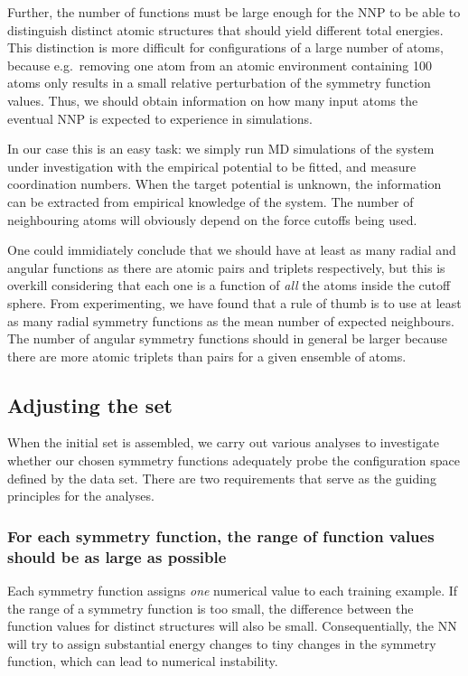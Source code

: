 \documentclass[twoside,english]{uiofysmaster}
\begin{document}
Further, the number of functions must be large enough for the NNP to be able to distinguish distinct atomic structures that
should yield different total energies. This distinction is more difficult for configurations of a large number of atoms, because
e.g.\ removing one atom from an atomic environment containing 100 atoms only results in a small relative 
perturbation of the symmetry function values. Thus, we should obtain information on how many input atoms 
the eventual NNP is expected to experience in simulations. 

In our case this is an easy task: we simply run MD simulations 
of the system under investigation with the empirical potential to be fitted, and measure coordination numbers. When the 
target potential is unknown, the information can be extracted from empirical knowledge of the system. The number of 
neighbouring atoms will obviously depend on the force cutoffs being used. 

One could immidiately conclude that we
should have at least as many radial and angular functions as there are atomic pairs and triplets respectively, but this is overkill
considering that each one is a function of \textit{all} the atoms inside the cutoff sphere.
From experimenting, we have found that a rule of thumb is to use at least as many radial symmetry functions
as the mean number of expected neighbours. The number of angular symmetry functions should in general be larger because
there are more atomic triplets than pairs for a given ensemble of atoms.  


\subsection{Adjusting the set} \label{sec:adjustSymmSet}
When the initial set is assembled, we carry out various analyses to investigate whether our chosen symmetry functions 
adequately probe the configuration space defined by the data set. There are two requirements
that serve as the guiding principles for the analyses.

\subsubsection{For each symmetry function, the range of function values should be as large as possible}
Each symmetry function
assigns \textit{one} numerical value to each training example. If the range of a symmetry function is too small, 
the difference between the function values for distinct structures will also be small. Consequentially, 
the NN will try to assign substantial energy changes to tiny changes in the symmetry function, which 
can lead to numerical instability. 
\end{document}

